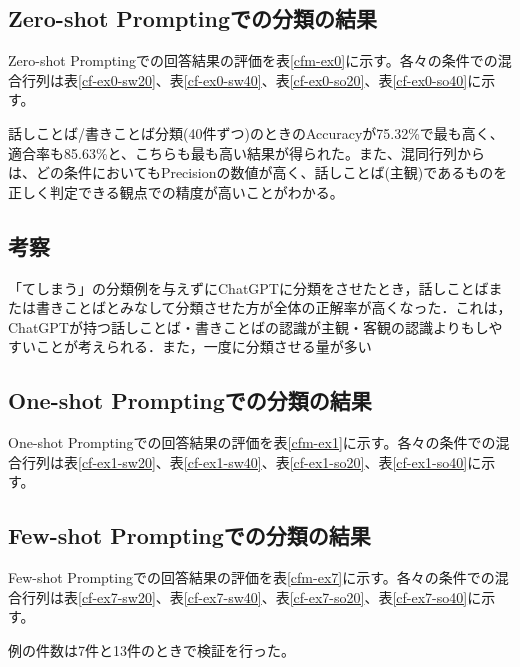 \subsection{Zero-shot Promptingでの分類の結果}
Zero-shot Promptingでの回答結果の評価を表\ref{cfm-ex0}に示す。各々の条件での混合行列は表\ref{cf-ex0-sw20}、表\ref{cf-ex0-sw40}、表\ref{cf-ex0-so20}、表\ref{cf-ex0-so40}に示す。






話しことば/書きことば分類(40件ずつ)のときのAccuracyが75.32\%で最も高く、適合率も85.63\%と、こちらも最も高い結果が得られた。また、混同行列からは、どの条件においてもPrecisionの数値が高く、話しことば(主観)であるものを正しく判定できる観点での精度が高いことがわかる。

\subsection{考察}
「てしまう」の分類例を与えずにChatGPTに分類をさせたとき，話しことばまたは書きことばとみなして分類させた方が全体の正解率が高くなった．これは，ChatGPTが持つ話しことば・書きことばの認識が主観・客観の認識よりもしやすいことが考えられる．また，一度に分類させる量が多い

\subsection{One-shot Promptingでの分類の結果}
One-shot Promptingでの回答結果の評価を表\ref{cfm-ex1}に示す。各々の条件での混合行列は表\ref{cf-ex1-sw20}、表\ref{cf-ex1-sw40}、表\ref{cf-ex1-so20}、表\ref{cf-ex1-so40}に示す。







\subsection{Few-shot Promptingでの分類の結果}
Few-shot Promptingでの回答結果の評価を表\ref{cfm-ex7}に示す。各々の条件での混合行列は表\ref{cf-ex7-sw20}、表\ref{cf-ex7-sw40}、表\ref{cf-ex7-so20}、表\ref{cf-ex7-so40}に示す。

例の件数は7件と13件のときで検証を行った。





